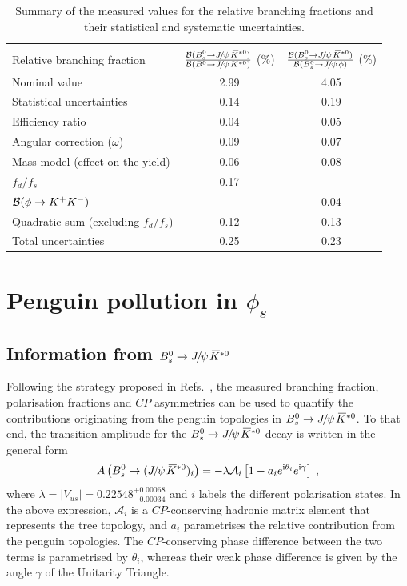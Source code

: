 \documentclass[12pt,a4paper]{article}
\newcommand{\CP}{\ensuremath{{C\!P}}\xspace}
\def\PJ      {\ensuremath{J}\xspace}
\def\CP                {\ensuremath{C\!P}\xspace}
\def\Ppsi {\ensuremath{\psi}\xspace}
\def\jpsi     {{\ensuremath{{\PJ\mskip -3mu/\mskip -2mu\Ppsi\mskip 2mu}}}\xspace}
\newcommand{\Bs}{\ensuremath{B^0_s}\xspace}
\newcommand{\BdJpsiKst}{\ensuremath{B^0\to \jpsi K^{*0}}\xspace}
\newcommand{\BsJpsiKst}{\ensuremath{B^0_s\to \jpsi \Kstarzb}\xspace}
\newcommand{\BsJpsiPhi}{\ensuremath{B^0_s\to \jpsi \phi}\xspace}
\newcommand{\phis}{\ensuremath{\phi_s}\xspace}
\def\Kbar  {\kern 0.2em\overline{\kern -0.2em K}{}\xspace}
\def\Kstarzb {\ensuremath{\Kbar^{*0}}\xspace}
\newcommand{\BRof}[1]{\ensuremath{{\cal B}(#1)}\xspace}
\begin{document}
\begin{table}[h!]
\begin{center}
\caption{Summary of the measured values for the relative branching fractions and their statistical and systematic uncertainties.}
\begin{tabular}{lcc}
\hline \\ [-2.0ex]
Relative branching fraction & {\large $\frac{\BRof\BsJpsiKst}{\BRof\BdJpsiKst}$} (\%) & {\large $\frac{\BRof\BsJpsiKst}{\BRof\BsJpsiPhi}$} (\%) \\ [1.0ex] \hline 
Nominal value & 2.99  & 4.05  \\\hline
Statistical uncertainties & 0.14  & 0.19  \\\hline
Efficiency ratio & 0.04  & 0.05  \\
Angular correction ($\omega$) & 0.09  & 0.07  \\
Mass model (effect on the yield) & 0.06  & 0.08  \\
$f_d/f_s$ & 0.17  & ---  \\
$\BRof{\phi\to K^+K^-}$ & --- & 0.04 \\
Quadratic sum (excluding $f_d/f_s$) & 0.12  & 0.13  \\ \hline
Total uncertainties & 0.25  & 0.23  \\\hline
\end{tabular}
\label{tab:syst_normalisation}
\end{center}
\end{table}


\section{Penguin pollution in \phis}\label{sec:penguins}
\subsection{Information from $\BsJpsiKst$}

Following the strategy proposed in Refs.~\cite{Fleischer:1999zi, Faller:2008gt, DeBruyn:2014oga}, the measured branching fraction, polarisation fractions and \CP asymmetries can be used to quantify the contributions originating from the penguin topologies in $\BsJpsiKst$.
To that end, the transition amplitude for the $\BsJpsiKst$ decay is written in the general form
\begin{equation}\label{Eq:DecAmp_b2ccd}
A\left(\Bs\to(\jpsi{}\Kstarzb)_i\right) = - \lambda \mathcal{A}_i \left[1 - a_ie^{\text{i}\theta_i}e^{\text{i}\gamma}\right]\:,
\end{equation}
where $\lambda = |V_{us}| = 0.22548^{+0.00068}_{-0.00034}$ \cite{Charles:2015gya} and $i$ labels the different polarisation states.
In the above expression, $\mathcal{A}_i$ is a \CP-conserving hadronic matrix element that represents the tree topology, and $a_i$ parametrises the relative contribution from the penguin topologies.
The \CP-conserving phase difference between the two terms is parametrised by $\theta_i$, whereas their weak phase difference is given by the angle $\gamma$ of the Unitarity Triangle.
\end{document}
